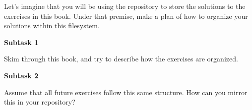 Let's imagine that you will be using the  repository to store the solutions to the exercises in this book. Under that premise, make a plan of how to organize your solutions within this filesystem.

\textbf{Subtask 1}

Skim through this book, and try to describe how the exercises are organized.

\textbf{Subtask 2}

Assume that all future exercises follow this same structure. How can you mirror this in your repository?

